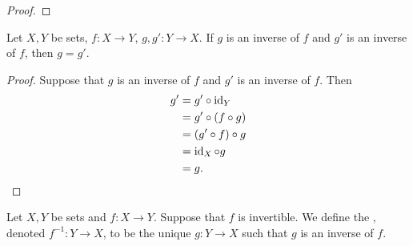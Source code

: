 \documentclass{book}
\begin{document}
	\begin{ex}
	\end{ex}
	
	\begin{proof}
		\tcr{finish!!!}
	\end{proof}
	
	\begin{ex}
		Let $X,Y$ be sets, $f:X \rightarrow Y$, $g,g':Y \rightarrow X$. If $g$ is an inverse of $f$ and $g'$ is an inverse of $f$, then $g = g'$.
	\end{ex}
	
	\begin{proof}
		Suppose that $g$ is an inverse of $f$ and $g'$ is an inverse of $f$. Then 
		\begin{align*}
			g'
			& = g' \circ \operatorname{id}_Y \\
			& = g' \circ (f \circ g) \\
			& = (g' \circ f) \circ g \\
			& = \operatorname{id}_X \circ g \\
			& = g.
		\end{align*}
	\end{proof}
	
	\begin{defn}
		Let $X,Y$ be sets and $f:X \rightarrow Y$. Suppose that $f$ is invertible. We define the , denoted $f^{-1}:Y \rightarrow X$, to be the unique $g:Y \rightarrow X$ such that $g$ is an inverse of $f$. 
	\end{defn}
	
	
	
	
	
	
	
	
	
	
	
	
	
	
	
	
	
	
	
	
	
	
	
	
	
	
	
	
	
	
	
	
	
	
	
	
	
	
	
	
	
	
	
	
	
\end{document}
